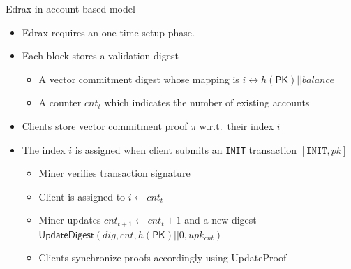 \documentclass[biblatex,aspectratio=169,11pt]{mybeamer}
\begin{document}
\begin{frame}{Edrax in account-based model}
  \vspace{-2em}
  \begin{itemize}
    \item Edrax requires an \alert{one-time setup phase}. 
      \item Each block stores a validation digest
        \begin{itemize}
          \item A vector commitment digest whose mapping is $i \leftrightarrow h(\textsf{PK}) || balance$
          \item A counter $cnt_t$ which indicates the number of existing accounts
        \end{itemize}
      \item Clients store vector commitment proof $\pi$ w.r.t.\ their index $i$
      \item The index $i$ is assigned when client submits an \alert{\texttt{INIT} transaction} $[\texttt{INIT}, pk]$
        \begin{itemize}
          \item Miner verifies transaction signature
          \item Client is assigned to $i \gets cnt_t$
          \item Miner updates $cnt_{t+1} \gets cnt_t + 1$ and a new digest \\
            $\textsf{UpdateDigest}(dig, cnt, h(\textsf{PK}) || 0, upk_{cnt})$
          \item Clients synchronize proofs accordingly using UpdateProof
        \end{itemize}
  \end{itemize}
\end{frame}
\end{document}
